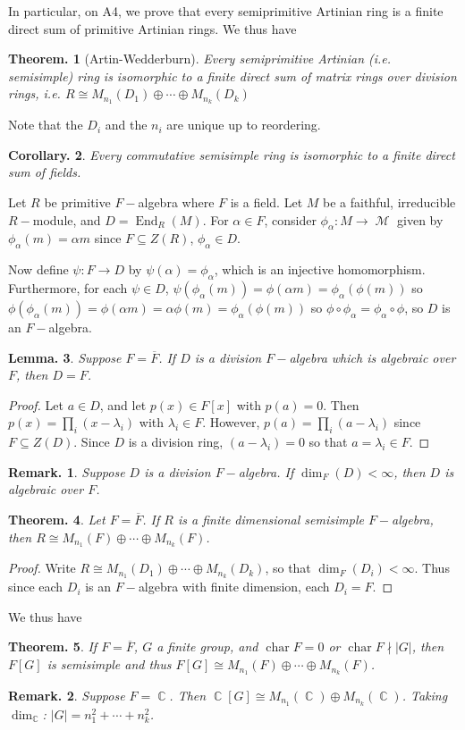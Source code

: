 \documentclass[11pt, a4paper]{memoir}
\DeclareMathOperator{\C}{{\mathbb{C}}}
\theoremstyle{change}
\newtheorem{theorem}{Theorem.}[section]
\newtheorem{lemma}[theorem]{Lemma.}
\newtheorem{corollary}[theorem]{Corollary.}
\theoremstyle{plain}
\theoremstyle{nonumberplain}
\newtheorem{remark}{Remark.}
\newtheorem{proof}{Proof}
\DeclareMathOperator{\chr}{char}
\DeclareMathOperator{\End}{End}
\DeclareMathOperator{\M}{{\mathcal{M}}}
\numberwithin{equation}{section}
\begin{document}
In particular, on A4, we prove that every semiprimitive Artinian ring is a finite direct sum of primitive Artinian rings.
We thus have
\begin{theorem}[Artin-Wedderburn]
    Every semiprimitive Artinian (i.e. semisimple) ring is isomorphic to a finite direct sum of matrix rings over division rings, i.e. $R\cong M_{n_1}(D_1)\oplus\cdots\oplus M_{n_k}(D_k)$
\end{theorem}
Note that the $D_i$ and the $n_i$ are unique up to reordering.
\begin{corollary}
    Every commutative semisimple ring is isomorphic to a finite direct sum of fields.
\end{corollary}
Let $R$ be primitive $F-$algebra where $F$ is a field.
Let $M$ be a faithful, irreducible $R-$module, and $D=\End_R(M)$.
For $\alpha\in F$, consider $\phi_\alpha:M\to\M$ given by $\phi_\alpha(m)=\alpha m$ since $F\subseteq Z(R)$, $\phi_\alpha\in D$.

Now define $\psi:F\to D$ by $\psi(\alpha)=\phi_\alpha$, which is an injective homomorphism.
Furthermore, for each $\psi\in D$, $\psi(\phi_\alpha(m))=\phi(\alpha m)=\phi_\alpha(\phi(m))$ so $\phi(\phi_\alpha(m))=\phi(\alpha m)=\alpha\phi(m)=\phi_\alpha(\phi(m))$ so $\phi\circ\phi_\alpha=\phi_\alpha\circ\phi$, so $D$ is an $F-$algebra.
\begin{lemma}
    Suppose $F=\overline{F}$.
    If $D$ is a division $F-$algebra which is algebraic over $F$, then $D=F$.
\end{lemma}
\begin{proof}
    Let $a\in D$, and let $p(x)\in F[x]$ with $p(a)=0$.
    Then $p(x)=\prod_i(x-\lambda_i)$ with $\lambda_i\in F$.
    However, $p(a)=\prod_i(a-\lambda_i)$ since $F\subseteq Z(D)$.
    Since $D$ is a division ring, $(a-\lambda_i)=0$ so that $a=\lambda_i\in F$.
\end{proof}
\begin{remark}
    Suppose $D$ is a division $F-$algebra.
    If $\dim_F(D)<\infty$, then $D$ is algebraic over $F$.
\end{remark}
\begin{theorem}
    Let $F=\overline{F}$.
    If $R$ is a finite dimensional semisimple $F-$algebra, then $R\cong M_{n_1}(F)\oplus\cdots\oplus M_{n_k}(F)$.
\end{theorem}
\begin{proof}
    Write $R\cong M_{n_1}(D_1)\oplus\cdots\oplus M_{n_k}(D_k)$, so that $\dim_F(D_i)<\infty$.
    Thus since each $D_i$ is an $F-$algebra with finite dimension, each $D_i=F$.
\end{proof}
We thus have
\begin{theorem}
    If $F=\overline{F}$, $G$ a finite group, and $\chr F=0$ or $\chr F\nmid |G|$, then $F[G]$ is semisimple and thus $F[G]\cong M_{n_1}(F)\oplus\cdots\oplus M_{n_k}(F)$.
\end{theorem}
\begin{remark}
    Suppose $F=\C$.
    Then $\C[G]\cong M_{n_1}(\C)\oplus M_{n_k}(\C)$.
    Taking $\dim_{\C}$: $|G|=n_1^2+\cdots+n_k^2$.
\end{remark}
\end{document}
